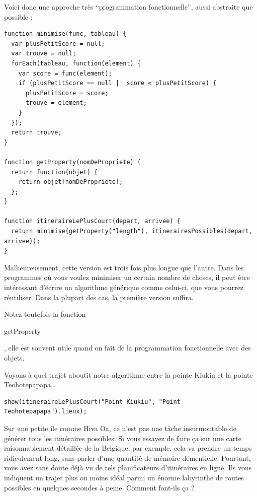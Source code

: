 \documentclass{FramateX}
\renewcommand{\texttt}[1]{\begin{sffamily}{#1}\end{sffamily}}
\begin{document}
Voici donc une approche très ``programmation fonctionnelle'', aussi
abstraite que possible :

\begin{lstlisting}
function minimise(func, tableau) {
  var plusPetitScore = null;
  var trouve = null;
  forEach(tableau, function(element) {
    var score = func(element);
    if (plusPetitScore == null || score < plusPetitScore) {
      plusPetitScore = score;
      trouve = element;
    }
  });
  return trouve;
}

function getProperty(nomDePropriete) {
  return function(objet) {
    return objet[nomDePropriete];
  };
}

function itineraireLePlusCourt(depart, arrivee) {
  return minimise(getProperty("length"), itinerairesPossibles(depart, arrivee));
}
\end{lstlisting}
Malheureusement, cette version est trois fois plus longue que l'autre.
Dans les programmes où vous voulez minimiser un certain nombre de
choses, il peut être intéressant d'écrire un algorithme générique comme
celui-ci, que vous pourrez réutiliser. Dans la plupart des cas, la
première version suffira.

Notez toutefois la fonction \texttt{getProperty}, elle est souvent utile
quand on fait de la programmation fonctionnelle avec des objets.

\begin{center}\end{center}

Voyons à quel trajet aboutit notre algorithme entre la pointe Kiukiu et
la pointe Teohotepapapa\ldots{}

\begin{lstlisting}
show(itineraireLePlusCourt("Point Kiukiu", "Point Teohotepapapa").lieux);
\end{lstlisting}
\begin{center}\end{center}

Sur une petite île comme Hiva Oa, ce n'est pas une tâche insurmontable
de générer tous les itinéraires possibles. Si vous essayez de faire ça
sur une carte raisonnablement détaillée de la Belgique, par exemple,
cela va prendre un temps ridiculement long, sans parler d'une quantité
de mémoire démentielle. Pourtant, vous avez sans doute déjà vu de tels
planificateurs d'itinéraires en ligne. Ils vous indiquent un trajet plus
ou moins idéal parmi un énorme labyrinthe de routes possibles en
quelques secondes à peine. Comment font-ils ça ?
\end{document}
